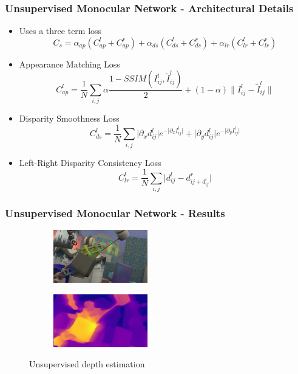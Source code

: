 \documentclass{beamer}
\begin{document}
\begin{frame}
\frametitle{Unsupervised Monocular Network - Architectural Details}
\center
\begin{itemize}
	\item Uses a three term loss
	\[
		C_s=\alpha_{ap}(C^l_{ap}+C^r_{ap})+\alpha_{ds}(C^l_{ds}+C^r_{ds})+\alpha_{lr}(C^l_{lr}+C^r_{lr})
	\]
	\item Appearance Matching Loss
	\[
		C^l_{ap}=\frac{1}{N}\sum_{i,j}\alpha\frac{1-SSIM(I^l_{ij},\tilde{I}^l_{ij})}{2}+(1-\alpha)\lVert I^l_{ij}-\tilde{I}^l_{ij}\rVert
	\]
	\item Disparity Smoothness Loss
	\[
		C^l_{ds}=\frac{1}{N}\sum_{i,j} \lvert \partial_x d^l_{ij} \rvert e^{-\lvert \partial_x I^l_{ij} \rvert} + \lvert \partial_y d^l_{ij} \rvert e^{-\lvert \partial_y I^l_{ij} \rvert}
	\]
	\item Left-Right Disparity Consistency Loss
	\[
		C^l_{lr}=\frac{1}{N}\sum_{i,j} \lvert d^l_{ij} - d^r_{ij + d^l_{ij}} \rvert
	\]
\end{itemize}
\end{frame}

\begin{frame}
\frametitle{Unsupervised Monocular Network - Results}
\center
\begin{figure}
	\centering
	\begin{subfigure}
		\centering
    	\includegraphics[width=0.45\textwidth]{original_depth.png}
    \end{subfigure}
    \begin{subfigure}
		\centering
        \includegraphics[width=0.45\textwidth]{monodepth_estimation.png}
    \end{subfigure}
    \caption{Unsupervised depth estimation}
\end{figure}
\end{frame}
\end{document}
